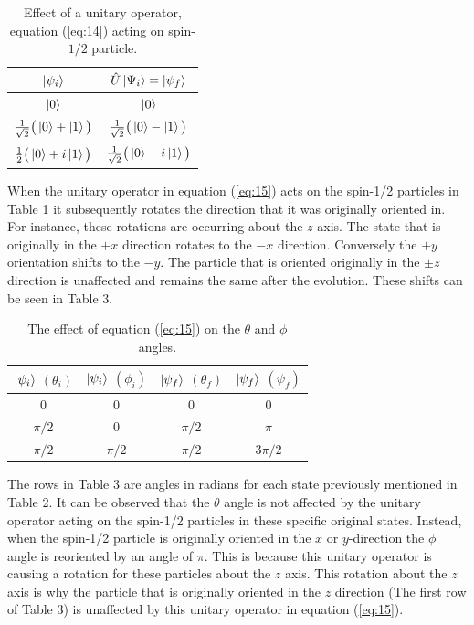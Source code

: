 \documentclass[twocolumn]{article}
\begin{document}
\begin{table}[h!]
\begin{center}
\begin{tabular}{ |c|c| }
\hline $\ket{\psi_i}$& $\hat{U}\ket{\Psi_i}=\ket{\psi_f}$ \\
\hline $\ket{0}$& $\ket{0}$\\
\hline $\frac{1}{\sqrt{2}}\big(\ket{0}+\ket{1}\big)$& $\frac{1}{\sqrt{2}}\big(\ket{0}-\ket{1}\big)$\\
\hline $\frac{1}{2}\big(\ket{0}+i\ket{1}\big)$& $\frac{1}{\sqrt{2}}\big(\ket{0}-i\ket{1}\big)$\\
\hline
\end{tabular}
\caption{Effect of a unitary operator, equation (\ref{eq:14}) acting on spin-$1/2$ particle.}
\end{center}
\end{table}
\newline 
When the unitary operator in equation (\ref{eq:15}) acts on the spin-1/2 particles in Table 1 it subsequently rotates the direction that it was originally oriented in. For instance, these rotations are occurring about the $z$ axis. The state that is originally in the $+x$ direction rotates to the $-x$ direction. Conversely the $+y$ orientation shifts to the $-y$. The particle that is oriented originally in the $\pm z$ direction is unaffected and remains the same after the evolution. These shifts can be seen in Table 3.
\begin{table}[h!]
\begin{center}
\begin{tabular}{ |c|c|c|c| }
\hline $\ket{\psi_i}$ $(\theta_i)$& $\ket{\psi_i}$ $(\phi_i)$& $\ket{\psi_f}$ $(\theta_f)$& $\ket{\psi_f}$ $(\psi_f)$ \\
\hline 0 & 0 & 0 & 0 \\
\hline $\pi/2$ & 0 & $\pi/2$ & $\pi$ \\
\hline $\pi/2$ & $\pi/2$ & $\pi/2$ & $3\pi/2$ \\
\hline
\end{tabular}
\caption{The effect of equation (\ref{eq:15}) on the $\theta$ and $\phi$ angles.}
\end{center}
\end{table}
\newline
The rows in Table 3 are angles in radians for each state previously mentioned in Table 2. It can be observed that the $\theta$ angle is not affected by the unitary operator acting on the spin-1/2 particles in these specific original states. Instead, when the spin-1/2 particle is originally oriented in the $x$ or $y$-direction the $\phi$ angle is reoriented by an angle of $\pi$. This is because this unitary operator is causing a rotation for these particles about the $z$ axis. This rotation about the $z$ axis is why the particle that is originally oriented in the $z$ direction (The first row of Table 3) is unaffected by this unitary operator in equation (\ref{eq:15}).
\end{document}
